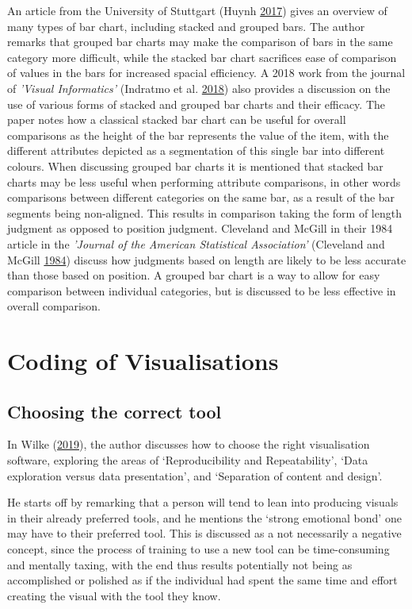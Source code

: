 \documentclass[
  11pt,
]{book}
\begin{document}
An article from the University of Stuttgart (Huynh
\protect\hyperlink{ref-HuynhHaiDang2017}{2017}) gives an overview of
many types of bar chart, including stacked and grouped bars. The author
remarks that grouped bar charts may make the comparison of bars in the
same category more difficult, while the stacked bar chart sacrifices
ease of comparison of values in the bars for increased spacial
efficiency. A 2018 work from the journal of
\textit{'Visual Informatics'} (Indratmo et al.
\protect\hyperlink{ref-INDRATMO2018155}{2018}) also provides a
discussion on the use of various forms of stacked and grouped bar charts
and their efficacy. The paper notes how a classical stacked bar chart
can be useful for overall comparisons as the height of the bar
represents the value of the item, with the different attributes depicted
as a segmentation of this single bar into different colours. When
discussing grouped bar charts it is mentioned that stacked bar charts
may be less useful when performing attribute comparisons, in other words
comparisons between different categories on the same bar, as a result of
the bar segments being non-aligned. This results in comparison taking
the form of length judgment as opposed to position judgment. Cleveland
and McGill in their 1984 article in the
\textit{'Journal of the American Statistical Association'} (Cleveland
and McGill \protect\hyperlink{ref-clevelandmcgill}{1984}) discuss how
judgments based on length are likely to be less accurate than those
based on position. A grouped bar chart is a way to allow for easy
comparison between individual categories, but is discussed to be less
effective in overall comparison.

\section{Coding of Visualisations}

\subsection{Choosing the correct tool}

In Wilke (\protect\hyperlink{ref-wilke2019}{2019}), the author discusses
how to choose the right visualisation software, exploring the areas of
`Reproducibility and Repeatability', `Data exploration versus data
presentation', and `Separation of content and design'.

He starts off by remarking that a person will tend to lean into
producing visuals in their already preferred tools, and he mentions the
`strong emotional bond' one may have to their preferred tool. This is
discussed as a not necessarily a negative concept, since the process of
training to use a new tool can be time-consuming and mentally taxing,
with the end thus results potentially not being as accomplished or
polished as if the individual had spent the same time and effort
creating the visual with the tool they know.
\end{document}
